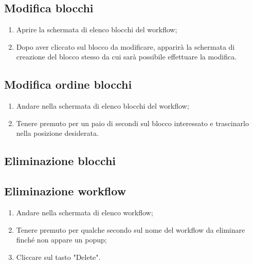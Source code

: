 \subsection{Modifica blocchi}
\begin{enumerate}
	\item Aprire la schermata di elenco blocchi del workflow;
	\item Dopo aver cliccato sul blocco da modificare, apparirà la schermata di creazione del blocco stesso da cui sarà possibile effettuare la modifica.
\end{enumerate}

\subsection{Modifica ordine blocchi}
\begin{enumerate}
	\item Andare nella schermata di elenco blocchi del workflow;
	\item Tenere premuto per un paio di secondi sul blocco interessato e trascinarlo nella posizione desiderata.
\end{enumerate}

\subsection{Eliminazione blocchi}

\subsection{Eliminazione workflow}
\begin{enumerate}
	\item Andare nella schermata di elenco workflow;
	\item Tenere premuto per qualche secondo sul nome del workflow da eliminare finché non appare un popup;
	\item Cliccare sul tasto "Delete".
\end{enumerate}

\newpage

